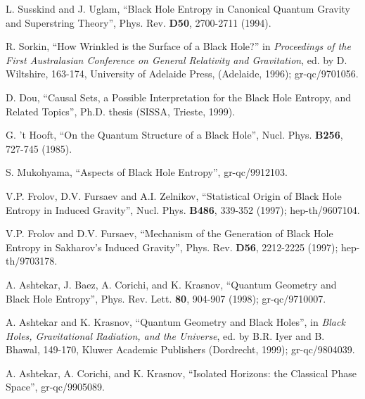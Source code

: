 \begin{thebibliography}{999}
 L. Susskind and J. Uglam, ``Black Hole
Entropy in Canonical Quantum Gravity and Superstring Theory'',
Phys. Rev. {\bf D50}, 2700-2711 (1994). 

 R. Sorkin, ``How Wrinkled is the
Surface of a Black Hole?'' in {\it Proceedings of the First
Australasian Conference on General Relativity and Gravitation}, ed. by
D. Wiltshire, 163-174, University of Adelaide Press, (Adelaide, 1996);
gr-qc/9701056. 

 D. Dou, ``Causal Sets, a Possible
Interpretation for the Black Hole Entropy, and Related Topics'',
Ph.D. thesis (SISSA, Trieste, 1999).

 G. 't Hooft, ``On the Quantum Structure
of a Black Hole'', Nucl. Phys. {\bf B256}, 727-745 (1985).

 S. Mukohyama, ``Aspects of Black Hole
Entropy'', gr-qc/9912103. 

 V.P. Frolov, D.V. Fursaev and
A.I. Zelnikov, ``Statistical Origin of Black Hole Entropy in Induced
Gravity'', Nucl. Phys. {\bf B486}, 339-352 (1997); hep-th/9607104.

 V.P. Frolov and D.V. Fursaev,
``Mechanism of the Generation of Black Hole Entropy in Sakharov's
Induced Gravity'', Phys. Rev. {\bf D56}, 2212-2225 (1997);
hep-th/9703178.  

 A. Ashtekar, J. Baez, A. Corichi, and
K. Krasnov, ``Quantum Geometry and Black Hole Entropy'',
Phys. Rev. Lett. {\bf 80}, 904-907 (1998);
gr-qc/9710007. 

 A. Ashtekar and K. Krasnov, ``Quantum
Geometry and Black Holes'', in {\it Black Holes, Gravitational
Radiation, and the Universe}, ed. by B.R. Iyer and B. Bhawal, 149-170,
Kluwer Academic Publishers (Dordrecht, 1999); gr-qc/9804039.

 A. Ashtekar, A. Corichi, and K. Krasnov,
``Isolated Horizons: the Classical Phase Space'', gr-qc/9905089.


\end{thebibliography}
